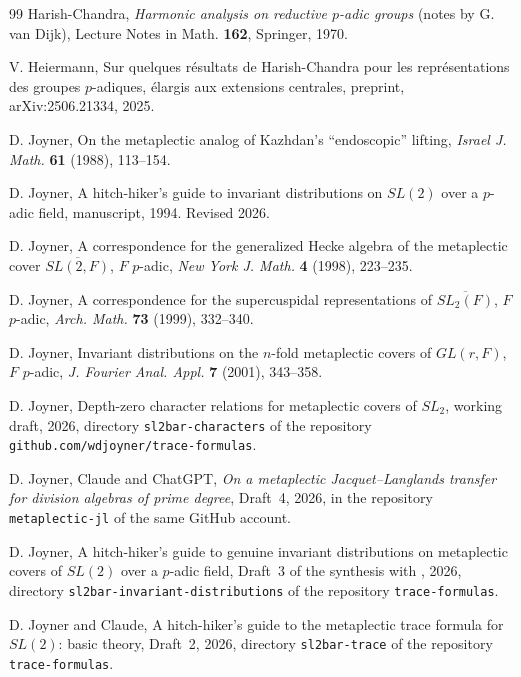 \documentclass[12pt,letterpaper]{article}
\numberwithin{equation}{section}
\theoremstyle{definition}
\begin{document}
\begin{thebibliography}{99}
 Harish-Chandra, \emph{Harmonic analysis on reductive $p$-adic groups}
(notes by G. van Dijk), Lecture Notes in Math. \textbf{162}, Springer, 1970.

 V. Heiermann, Sur quelques r\'esultats de Harish-Chandra pour les
repr\'esentations des groupes $p$-adiques, \'elargis aux extensions centrales, preprint,
arXiv:2506.21334, 2025.

 D. Joyner, On the metaplectic analog of Kazhdan's ``endoscopic''
lifting, \emph{Israel J. Math.} \textbf{61} (1988), 113--154.

 D. Joyner, A hitch-hiker's guide to invariant distributions on
$SL(2)$ over a $p$-adic field, manuscript, 1994.  Revised 2026.

 D. Joyner, A correspondence for the generalized Hecke algebra of the
metaplectic cover $\overline{SL(2,F)}$, $F$ $p$-adic, \emph{New York J. Math.} \textbf{4}
(1998), 223--235.

 D. Joyner, A correspondence for the supercuspidal representations of
$\overline{SL_2(F)}$, $F$ $p$-adic, \emph{Arch. Math.} \textbf{73} (1999), 332--340.

 D. Joyner, Invariant distributions on the $n$-fold metaplectic covers
of $GL(r,F)$, $F$ $p$-adic, \emph{J. Fourier Anal. Appl.} \textbf{7} (2001), 343--358.

 D. Joyner, Depth-zero character relations for metaplectic covers of
$SL_2$, working draft, 2026, directory \texttt{sl2bar-characters} of the repository
\texttt{github.com/wdjoyner/trace-formulas}.

 D. Joyner, Claude and ChatGPT, \emph{On a metaplectic
Jacquet--Langlands transfer for division algebras of prime degree}, Draft~4, 2026, in the
repository \texttt{metaplectic-jl} of the same GitHub account.

 D. Joyner, A hitch-hiker's guide to genuine invariant distributions
on metaplectic covers of $SL(2)$ over a $p$-adic field, Draft~3 of the synthesis with
\cite{Jo01}, 2026, directory \texttt{sl2bar-invariant-distributions} of the repository
\texttt{trace-formulas}.

 D. Joyner and Claude, A hitch-hiker's guide to the metaplectic trace
formula for $SL(2)$: basic theory, Draft~2, 2026, directory \texttt{sl2bar-trace} of the
repository \texttt{trace-formulas}.


\end{thebibliography}
\end{document}
